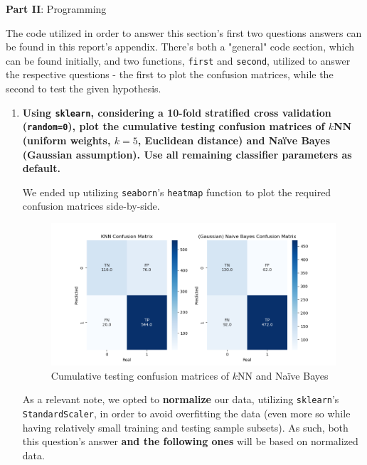 \documentclass[12pt]{article}
\begin{document}
\pagebreak

\center\large{\textbf{Part II}: Programming}

\begin{justify}
  The code utilized in order to answer this section's first two questions answers
  can be found in this report's appendix. There's both a "general" code section,
  which can be found initially, and two functions, \texttt{first} and \texttt{second},
  utilized to answer the respective questions - the first to plot the confusion matrices,
  while the second to test the given hypothesis.
\end{justify}

\begin{enumerate}[leftmargin=\labelsep,resume]
  \item \textbf{Using \texttt{sklearn}, considering a 10-fold stratified cross validation (\texttt{random=0}), plot the cumulative
          testing confusion matrices of $k$NN (uniform weights, $k = 5$, Euclidean distance) and Naïve Bayes
          (Gaussian assumption). Use all remaining classifier parameters as default.}

        We ended up utilizing \texttt{seaborn}'s \texttt{heatmap} function to plot the
        required confusion matrices side-by-side.

        \begin{figure}[h]
          \centering
          \includegraphics[width=1.1\textwidth]{../assets/hw2-2.1.png}
          \caption{Cumulative testing confusion matrices of $k$NN and Naïve Bayes}
          \label{fig:fig1}
        \end{figure}

        As a relevant note, we opted to \textbf{normalize} our data, utilizing \texttt{sklearn}'s
        \texttt{StandardScaler}, in order to avoid overfitting the data (even more so while
        having relatively small training and testing sample subsets). As such, both this
        question's answer \textbf{and the following ones} will be based on normalized data.


\end{enumerate}
\end{document}
